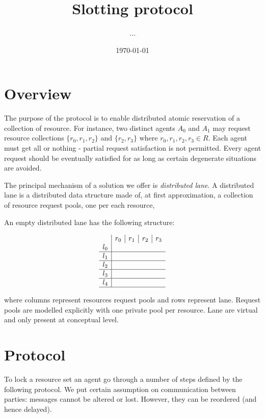 \documentclass[11pt,parskip=half]{scrartcl} %
\begin{document}
	
	\title{Slotting protocol}
	\subtitle{...}
	\date{\today}
	\maketitle
	
	
	\section{Overview}
	
	The purpose of the protocol is to enable distributed atomic reservation of a collection of resource. For instance, two distinct agents $A_0$ and $A_1$ may request resource collections $\{r_0, r_1, r_2\}$ and $\{r_2, r_3\}$ where $r_0, r_1, r_2, r_3 \in R$. Each agent must get all or nothing - partial request satisfaction is not permitted. Every agent request should be eventually satisfied for as long as certain degenerate situations are avoided. 
	
	The principal mechanism of a solution we offer is \emph{distributed lane}. A distributed lane is a distributed data structure made of, at first approximation, a collection of resource request pools, one per each resource,
	
	An empty distributed lane has the following structure:
	
	$$
	\begin{array}{c|c|c|c|c}
	& r_0 & r_1 & r_2 & r_3 \\
	l_0  \\ \hline
	l_1  \\ \hline
	l_2  \\ \hline
	l_3  \\ \hline
	l_4  \\ \hline
	\end{array}
	$$
	
	where columns represent resources request pools and rows represent lane. Request pools are modelled explicitly with one private pool per resource. Lane are virtual and only present at conceptual level.
	
	\section*{Protocol}
	
	To lock a resource set an agent go through a number of steps defined by the following protocol. We put certain assumption on communication between parties: messages cannot be altered or lost. However, they can be reordered (and hence delayed).
	
\end{document}
